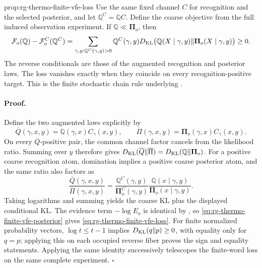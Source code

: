 {prop:rg-thermo-finite-vfe-loss}
Use the same fixed channel $C$ for recognition and the selected posterior,
and let $\mathbb Q^C=\mathbb Q C$. Define the coarse objective from
the full induced observation experiment. If
$\mathbb Q\ll\boldsymbol\Pi_o$, then
\begin{equation}
 \mathcal F_o(\mathbb Q)-\mathcal F_o^C(\mathbb Q^C)
 =\sum_{\gamma,y:\mathbb Q^C(\gamma,y)>0}
   \mathbb Q^C(\gamma,y)
   D_{\mathrm{KL}}\bigl(\mathbb Q(X\mid\gamma,y)\Vert
             \boldsymbol\Pi_o(X\mid\gamma,y)\bigr)\geq0.
 \label{eq:rg-thermo-finite-vfe-loss}
\end{equation}
The reverse conditionals are those of the augmented recognition and
posterior laws. The loss vanishes exactly when they coincide on every
recognition-positive target. This is the finite stochastic chain rule
underlying .\thermoestablishedstatus


\paragraph{Proof.}
Define the two augmented laws explicitly by
\begin{equation}
 \overline Q(\gamma,x,y)=\mathbb Q(\gamma,x)C_\gamma(x,y),
 \qquad
 \overline\Pi(\gamma,x,y)=\boldsymbol\Pi_o(\gamma,x)C_\gamma(x,y).
 \label{eq:rg-thermo-finite-augmented-laws}
\end{equation}
On every $\overline Q$-positive pair, the common channel factor cancels
from the likelihood ratio. Summing over $y$ therefore gives
$D_{\mathrm{KL}}(\overline Q\Vert\overline\Pi)
 =D_{\mathrm{KL}}(\mathbb Q\Vert\boldsymbol\Pi_o)$.
For a positive coarse recognition atom, domination implies a positive
coarse posterior atom, and the same ratio also factors as
\begin{equation}
 \frac{\overline Q(\gamma,x,y)}{\overline\Pi(\gamma,x,y)}
 =\frac{\mathbb Q^C(\gamma,y)}{\boldsymbol\Pi_o^C(\gamma,y)}
   \frac{\mathbb Q(x\mid\gamma,y)}
        {\boldsymbol\Pi_o(x\mid\gamma,y)}.
 \label{eq:rg-thermo-finite-kl-factorization}
\end{equation}
Taking logarithms and summing yields the coarse KL plus the displayed
conditional KL. The evidence term $-\log E_o$ is identical by
, so
\cref{eq:rg-thermo-finite-vfe-posterior} gives
\cref{eq:rg-thermo-finite-vfe-loss}.
For finite normalized probability vectors, $\log t\leq t-1$ implies
$D_{\mathrm{KL}}(q\Vert p)\geq0$, with equality only for $q=p$; applying this on
each occupied reverse fiber proves the sign and equality statements.
Applying the same identity successively telescopes the finite-word loss
on the same complete experiment. $\square$

